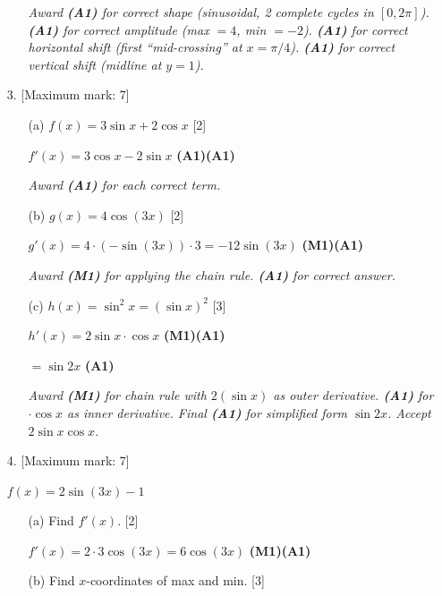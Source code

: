 \documentclass[12pt, twoside]{article}
\begin{document}
\begin{enumerate}
\begin{enumerate}
\textit{Award \textbf{(A1)} for correct shape (sinusoidal, 2 complete cycles in $[0, 2\pi]$).
\textbf{(A1)} for correct amplitude (max $= 4$, min $= -2$).
\textbf{(A1)} for correct horizontal shift (first ``mid-crossing'' at $x = \pi/4$).
\textbf{(A1)} for correct vertical shift (midline at $y = 1$).}
\end{enumerate}

\newpage

\item[3.] [Maximum mark: 7]

\begin{enumerate}
\item[(a)] $f(x) = 3\sin x + 2\cos x$ \hfill [2]

$f'(x) = 3\cos x - 2\sin x$ \hfill \textbf{(A1)(A1)}

\textit{Award \textbf{(A1)} for each correct term.}

\item[(b)] $g(x) = 4\cos(3x)$ \hfill [2]

$g'(x) = 4 \cdot (-\sin(3x)) \cdot 3 = -12\sin(3x)$ \hfill \textbf{(M1)(A1)}

\textit{Award \textbf{(M1)} for applying the chain rule. \textbf{(A1)} for correct answer.}

\item[(c)] $h(x) = \sin^2 x = (\sin x)^2$ \hfill [3]

$h'(x) = 2\sin x \cdot \cos x$ \hfill \textbf{(M1)(A1)}

$= \sin 2x$ \hfill \textbf{(A1)}

\textit{Award \textbf{(M1)} for chain rule with $2(\sin x)$ as outer derivative.
\textbf{(A1)} for $\cdot\cos x$ as inner derivative. Final \textbf{(A1)} for
simplified form $\sin 2x$. Accept $2\sin x\cos x$.}
\end{enumerate}
\vspace{0.3cm}

\item[4.] [Maximum mark: 7]

$f(x) = 2\sin(3x) - 1$

\begin{enumerate}
\item[(a)] Find $f'(x)$. \hfill [2]

$f'(x) = 2 \cdot 3\cos(3x) = 6\cos(3x)$ \hfill \textbf{(M1)(A1)}

\item[(b)] Find $x$-coordinates of max and min. \hfill [3]


\end{enumerate}
\end{enumerate}
\end{document}
